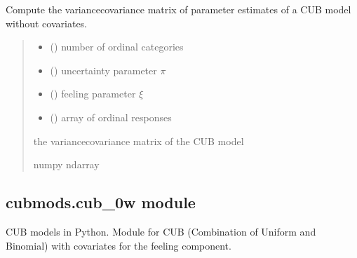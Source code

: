\documentclass[letterpaper,10pt,english]{sphinxmanual}
\begin{document}
\begin{fulllineitems}
\label{\detokenize{cubmods:cubmods.cub.varcov}}
\pysigstartsignatures
{}
\pysigstopsignatures
\sphinxAtStartPar
Compute the variance\sphinxhyphen{}covariance matrix of parameter 
estimates of a CUB model without covariates.
\begin{quote}\begin{description}
\begin{itemize}
\item {} 
\sphinxAtStartPar
{} () \textendash{} number of ordinal categories

\item {} 
\sphinxAtStartPar
{} () \textendash{} uncertainty parameter \(\pi\)

\item {} 
\sphinxAtStartPar
{} () \textendash{} feeling parameter \(\xi\)

\item {} 
\sphinxAtStartPar
{} () \textendash{} array of ordinal responses

\end{itemize}

\sphinxAtStartPar
the variance\sphinxhyphen{}covariance matrix of the CUB model

\sphinxAtStartPar
numpy ndarray

\end{description}\end{quote}

\end{fulllineitems}



\subsection{cubmods.cub\_0w module}
\label{\detokenize{cubmods:module-cubmods.cub_0w}}\label{\detokenize{cubmods:cubmods-cub-0w-module}}
\sphinxAtStartPar
CUB models in Python.
Module for CUB (Combination of Uniform
and Binomial) with covariates for the feeling component.
\end{document}
